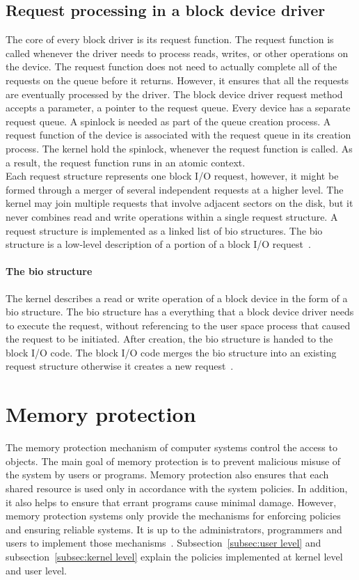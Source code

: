 \subsection*{Request processing in a block device driver}

The core of every block driver is its request function. The request function is called whenever the driver needs to process reads, writes, or other operations on the device. The request function does not need to actually complete all of the requests on the queue before it returns. However, it ensures that all the requests are eventually processed by the driver. The block device driver request method accepts a parameter, a pointer to the request queue. Every device has a separate request queue. A spinlock is needed as part of the queue creation process. A request function of the device is associated with the request queue in its creation process. The kernel hold the spinlock, whenever the request function is called. As a result, the request function runs in an atomic context.
\\[3mm]
Each request structure represents one block I/O request, however, it might be formed through a merger of several independent requests at a higher level.
The kernel may join multiple requests that involve adjacent sectors on the disk, but it never combines read and write operations within a single request structure. A request structure is implemented as a linked list of bio structures. The bio structure is a low-level description of a portion of a block I/O request~\cite{Corbet:2005:LDD:1209083}.

\paragraph{The bio structure}
The kernel describes a read or write operation of a block device in the form of a bio structure. The bio structure has a everything that a block device driver needs to execute the request, without referencing to the user space process that caused the request to be initiated. After creation, the bio structure is handed to the block I/O code. The block I/O code merges the bio structure into an existing request structure otherwise it creates a new request~\cite{Corbet:2005:LDD:1209083}. 

\section{Memory protection}
The memory protection mechanism of computer systems control the access to objects. The main goal of memory protection is to prevent malicious misuse of the system by users or programs. Memory protection also ensures that each shared resource is used only in accordance with the system policies. In addition, it also helps to ensure that errant programs cause minimal damage. However, memory protection systems only provide the mechanisms for enforcing policies and ensuring reliable systems. It is up to the administrators, programmers and users to implement those mechanisms~\cite{Galvin, Graham:1971:PPP:1478873.1478928}. Subsection~\ref{subsec:user level} and subsection~\ref{subsec:kernel level} explain the policies implemented at kernel level and user level. 

